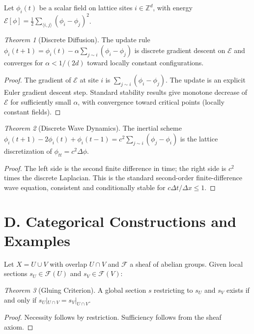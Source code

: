 \documentclass[12pt,a4paper,openany]{book}
\theoremstyle{plain}
\theoremstyle{definition}
\theoremstyle{remark}
\newtheorem*{theorem*}{Theorem}
\begin{document}
Let $\phi_i(t)$ be a scalar field on lattice sites $i \in \mathbb{Z}^d$, with energy $\mathcal{E}[\phi] = \frac{1}{2}\sum_{\langle i,j\rangle}(\phi_i-\phi_j)^2$.

\begin{theorem*}[Discrete Diffusion]
The update rule $\phi_i(t+1) = \phi_i(t) - \alpha\sum_{j\sim i}(\phi_i-\phi_j)$ is discrete gradient descent on $\mathcal{E}$ and converges for $\alpha < 1/(2d)$ toward locally constant configurations.
\end{theorem*}

\begin{proof}
The gradient of $\mathcal{E}$ at site $i$ is $\sum_{j\sim i}(\phi_i-\phi_j)$. The update is an explicit Euler gradient descent step. Standard stability results give monotone decrease of $\mathcal{E}$ for sufficiently small $\alpha$, with convergence toward critical points (locally constant fields).
\end{proof}

\begin{theorem*}[Discrete Wave Dynamics]
The inertial scheme $\phi_i(t+1) - 2\phi_i(t) + \phi_i(t-1) = c^2\sum_{j\sim i}(\phi_j-\phi_i)$ is the lattice discretization of $\phi_{tt} = c^2\Delta\phi$.
\end{theorem*}

\begin{proof}
The left side is the second finite difference in time; the right side is $c^2$ times the discrete Laplacian. This is the standard second-order finite-difference wave equation, consistent and conditionally stable for $c\Delta t/\Delta x \le 1$.
\end{proof}

\section*{D. Categorical Constructions and Examples}
\label{app:categorical_examples}

Let $X = U \cup V$ with overlap $U \cap V$ and $\mathcal{F}$ a sheaf of abelian groups. Given local sections $s_U \in \mathcal{F}(U)$ and $s_V \in \mathcal{F}(V)$:

\begin{theorem*}[Gluing Criterion]
A global section $s$ restricting to $s_U$ and $s_V$ exists if and only if $s_U|_{U\cap V} = s_V|_{U\cap V}$.
\end{theorem*}

\begin{proof}
Necessity follows by restriction. Sufficiency follows from the sheaf axiom.
\end{proof}
\end{document}
